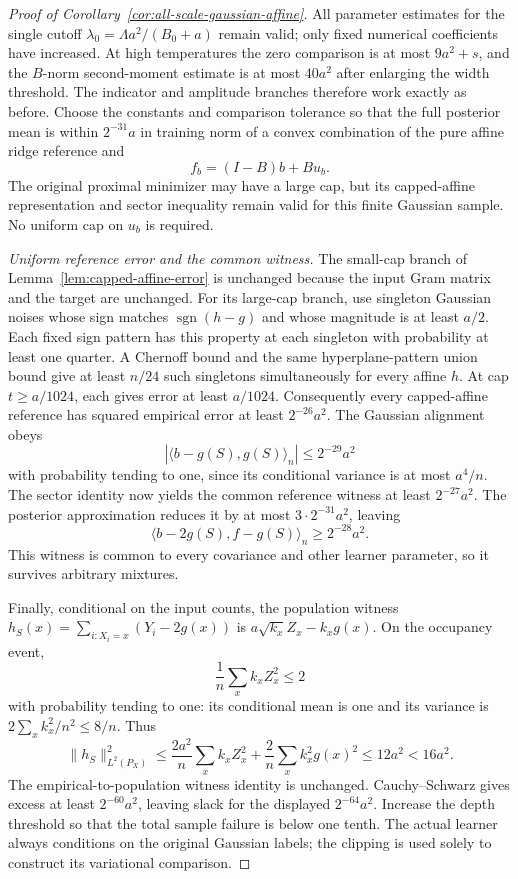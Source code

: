 \begin{proof}[Proof of Corollary~\ref{cor:all-scale-gaussian-affine}]
All parameter estimates for the single cutoff
$\lambda_0=\Lambda a^2/(B_0+a)$ remain valid; only fixed numerical coefficients have increased. At high temperatures the zero comparison is at most $9a^2+s$, and the $B$-norm second-moment estimate is at most $40a^2$ after enlarging the width threshold. The indicator and amplitude branches therefore work exactly as before. Choose the constants and comparison tolerance so that the full posterior mean is within $2^{-31}a$ in training norm of a convex combination of the pure affine ridge reference and
\[
 f_b=(I-B)b+Bu_b.
\]
The original proximal minimizer may have a large cap, but its capped-affine representation and sector inequality remain valid for this finite Gaussian sample. No uniform cap on $u_b$ is required.

\emph{Uniform reference error and the common witness.}
The small-cap branch of Lemma~\ref{lem:capped-affine-error} is unchanged because the input Gram matrix and the target are unchanged. For its large-cap branch, use singleton Gaussian noises whose sign matches $\operatorname{sgn}(h-g)$ and whose magnitude is at least $a/2$. Each fixed sign pattern has this property at each singleton with probability at least one quarter. A Chernoff bound and the same hyperplane-pattern union bound give at least $n/24$ such singletons simultaneously for every affine $h$. At cap $t\ge a/1024$, each gives error at least $a/1024$. Consequently every capped-affine reference has squared empirical error at least $2^{-26}a^2$.
The Gaussian alignment obeys
\[
 |\langle b-g(S),g(S)\rangle_n|\le2^{-29}a^2
\]
with probability tending to one, since its conditional variance is at most $a^4/n$. The sector identity now yields the common reference witness at least $2^{-27}a^2$. The posterior approximation reduces it by at most $3\cdot2^{-31}a^2$, leaving
\[
 \langle b-2g(S),f-g(S)\rangle_n\ge2^{-28}a^2.
\]
This witness is common to every covariance and other learner parameter, so it survives arbitrary mixtures.

Finally, conditional on the input counts, the population witness
$h_S(x)=\sum_{i:X_i=x}(Y_i-2g(x))$ is
$a\sqrt{k_x}Z_x-k_xg(x)$. On the occupancy event,
\[
 \frac1n\sum_x k_xZ_x^2\le2
\]
with probability tending to one: its conditional mean is one and its variance is $2\sum_xk_x^2/n^2\le8/n$. Thus
\[
 \|h_S\|_{L^2(P_X)}^2
 \le\frac{2a^2}{n}\sum_xk_xZ_x^2
       +\frac2n\sum_xk_x^2g(x)^2\le12a^2<16a^2.
\]
The empirical-to-population witness identity is unchanged. Cauchy--Schwarz gives excess at least $2^{-60}a^2$, leaving slack for the displayed $2^{-64}a^2$. Increase the depth threshold so that the total sample failure is below one tenth. The actual learner always conditions on the original Gaussian labels; the clipping is used solely to construct its variational comparison.
\end{proof}

